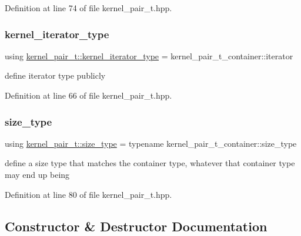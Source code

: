 Definition at line 74 of file kernel\+\_\+pair\+\_\+t.\+hpp.

\hypertarget{classkernel__pair__t_acd6ec478738b84ddad1c863b7c8b55c1}{}\label{classkernel__pair__t_acd6ec478738b84ddad1c863b7c8b55c1} 
\subsubsection{\texorpdfstring{kernel\+\_\+iterator\+\_\+type}{kernel\_iterator\_type}}
{\footnotesize\ttfamily using \hyperlink{classkernel__pair__t_acd6ec478738b84ddad1c863b7c8b55c1}{kernel\+\_\+pair\+\_\+t\+::kernel\+\_\+iterator\+\_\+type} =  kernel\+\_\+pair\+\_\+t\+\_\+container\+::iterator}

define iterator type publicly 

Definition at line 66 of file kernel\+\_\+pair\+\_\+t.\+hpp.

\hypertarget{classkernel__pair__t_aec4bb36f70893ab1bf0a912e8c3aca2a}{}\label{classkernel__pair__t_aec4bb36f70893ab1bf0a912e8c3aca2a} 
\subsubsection{\texorpdfstring{size\+\_\+type}{size\_type}}
{\footnotesize\ttfamily using \hyperlink{classkernel__pair__t_aec4bb36f70893ab1bf0a912e8c3aca2a}{kernel\+\_\+pair\+\_\+t\+::size\+\_\+type} =  typename kernel\+\_\+pair\+\_\+t\+\_\+container\+::size\+\_\+type}

define a size type that matches the container type, whatever that container type may end up being 

Definition at line 80 of file kernel\+\_\+pair\+\_\+t.\+hpp.



\subsection{Constructor \& Destructor Documentation}
\hypertarget{classkernel__pair__t_a7b3e46fff3f852a76b0af10002eb07f8}{}\label{classkernel__pair__t_a7b3e46fff3f852a76b0af10002eb07f8} 
